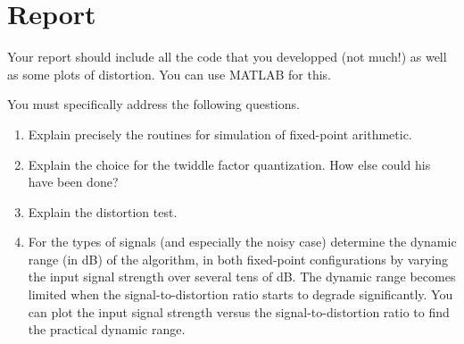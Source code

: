 \documentclass[11pt]{article}
\begin{document}
\section{Report}
Your report should include all the code that you developped (not much!) as well as some plots of distortion. You can use MATLAB for this. 

You must specifically address the following questions.

\begin{enumerate}
\item Explain precisely the routines for simulation of fixed-point arithmetic.
\item Explain the choice for the twiddle factor quantization.  How else could his have been done?
\item Explain the distortion test.
\item For the types of signals (and especially the noisy case) determine the dynamic range (in dB) of the algorithm, in both fixed-point configurations
by varying the input signal strength over several tens of dB.  The dynamic range becomes limited when the signal-to-distortion ratio starts to 
degrade significantly.  You can plot the input signal strength versus the signal-to-distortion ratio to find the practical dynamic range.
\end{enumerate}

\makeatother 
\end{document}

